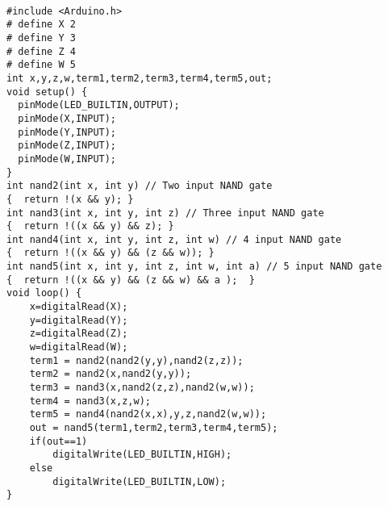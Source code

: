 \documentclass{article}
\begin{document}
\begin{verbatim}

#include <Arduino.h>
# define X 2
# define Y 3
# define Z 4
# define W 5
int x,y,z,w,term1,term2,term3,term4,term5,out;
void setup() {
  pinMode(LED_BUILTIN,OUTPUT);
  pinMode(X,INPUT);
  pinMode(Y,INPUT);
  pinMode(Z,INPUT);
  pinMode(W,INPUT);
}
int nand2(int x, int y) // Two input NAND gate
{  return !(x && y); }
int nand3(int x, int y, int z) // Three input NAND gate
{  return !((x && y) && z); }
int nand4(int x, int y, int z, int w) // 4 input NAND gate 
{  return !((x && y) && (z && w)); }
int nand5(int x, int y, int z, int w, int a) // 5 input NAND gate
{  return !((x && y) && (z && w) && a );  }
void loop() {
    x=digitalRead(X);
    y=digitalRead(Y);
    z=digitalRead(Z);
    w=digitalRead(W);
    term1 = nand2(nand2(y,y),nand2(z,z));
    term2 = nand2(x,nand2(y,y));
    term3 = nand3(x,nand2(z,z),nand2(w,w));
    term4 = nand3(x,z,w);
    term5 = nand4(nand2(x,x),y,z,nand2(w,w));
    out = nand5(term1,term2,term3,term4,term5);
    if(out==1)
        digitalWrite(LED_BUILTIN,HIGH);
    else
        digitalWrite(LED_BUILTIN,LOW);
}

\end{verbatim}
\end{document}
